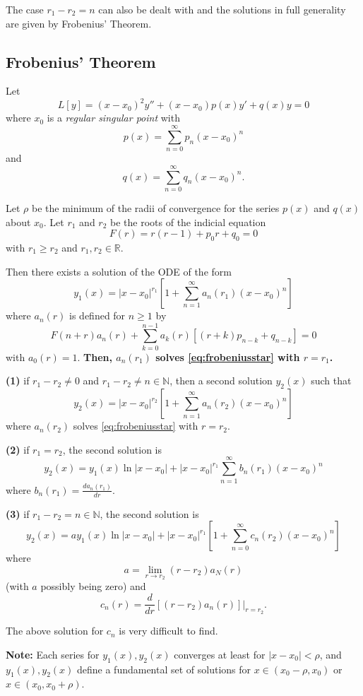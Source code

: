 \documentclass[11pt]{article}
\newcommand{\sumseries}{\sum_{n=0}^{\infty}}
\newcommand{\sumseriesone}{\sum_{n=1}^{\infty}}
\newcommand{\powerser}{(x - x_0)^n}
\begin{document}
	The case $r_1 - r_2 = n$ can also be dealt with and the solutions in full generality are given by Frobenius' Theorem.


\subsection{Frobenius' Theorem}
	Let
		$$ L[y] = (x - x_0)^2 y'' + (x-x_0) p(x) y' + q(x) y = 0 $$
	where $x_0$ is a \emph{regular singular point} with
		$$ p(x) = \sumseries p_n \powerser $$
	and
		$$ q(x) = \sumseries q_n \powerser .$$

	Let $\rho$ be the minimum of the radii of convergence for the series $p(x)$ and $q(x)$ about $x_0$. Let $r_1$ and $r_2$ be the roots of the indicial equation
		$$ F(r) = r(r-1) + p_0 r + q_0 = 0 $$
	with $r_1 \geq r_2$ and $r_1, r_2 \in \mathbb{R}$.

	Then there exists a solution of the ODE of the form
		$$ y_1 (x) = |x-x_0|^{r_1} \left[1 + \sumseriesone a_n (r_1) \powerser \right] $$
	where $a_n (r)$ is defined for $n \geq 1$ by
		\[
			 F(n+r) a_n (r) + \sum_{k=0}^{n-1} a_k (r) \left[(r+k) p_{n-k} + q_{n-k}\right] = 0
			 \tag{$\star$}
			 \label{eq:frobeniusstar}
		\]
	with $a_0 (r) = 1$. \textbf{Then, $a_n (r_1)$ solves \eqref{eq:frobeniusstar} with $r = r_1$.}

	\textbf{(1)} if $r_1 - r_2 \neq 0$ and $r_1 - r_2 \neq n \in \mathbb{N}$, then a second solution $y_2 (x)$ such that
		$$ y_2 (x) = |x-x_0|^{r_2} \left[1 + \sumseriesone a_n (r_2) \powerser \right] $$
	where $a_n (r_2)$ solves \eqref{eq:frobeniusstar} with $r = r_2$.

	\textbf{(2)} if $r_1 = r_2$, the second solution is
		$$ y_2 (x) = y_1 (x) \ln |x-x_0| + |x-x_0|^{r_1} \sumseriesone b_n (r_1) \powerser $$
	where $b_n (r_1) = \frac{d a_n (r_1)}{dr}$.

	\textbf{(3)} if $r_1 - r_2 = n \in \mathbb{N}$, the second solution is
		$$ y_2 (x) = a y_1(x) \ln |x-x_0| + |x-x_0|^{r_1} \left[1 + \sumseries c_n (r_2) \powerser \right] $$
	where
		$$ a = \lim_{r \to r_2} (r-r_2) a_N (r) $$
	(with $a$ possibly being zero) and
		$$ c_n (r) = \frac{d}{dr} \left[(r-r_2) a_n (r) \right] \Big|_{r=r_2}. $$

	The above solution for $c_n$ is very difficult to find.

	\textbf{Note:} Each series for $y_1 (x), y_2 (x)$ converges at least for $|x-x_0| < \rho$, and $y_1 (x), y_2 (x)$ define a fundamental set of solutions for $x \in (x_0 - \rho, x_0)$ or $x \in (x_0, x_0 + \rho)$.
\end{document}
